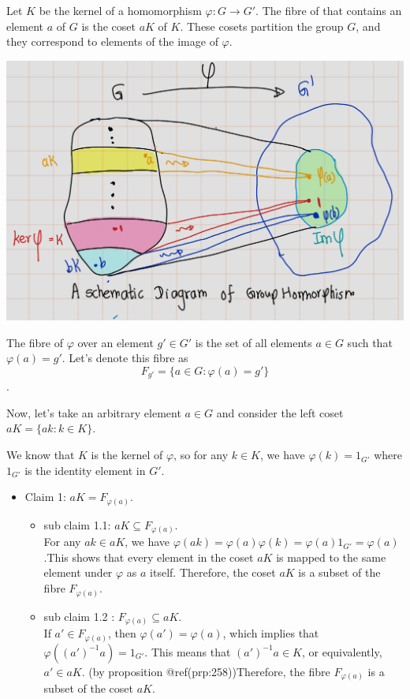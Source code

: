 \documentclass[
]{book}
\providecommand{\tightlist}{%
  \setlength{\itemsep}{0pt}\setlength{\parskip}{0pt}}
\begin{document}
\leavevmode{}%
Let \(K\) be the kernel of a homomorphism \(\varphi: G \to G'\). The
fibre of that contains an element \(a\) of \(G\) is the coset \(a K\) of
\(K\). These cosets partition the group \(G\), and they correspond to
elements of the image of \(\varphi\).

\includegraphics{figures/ch_2/fig35.png}

The fibre of \(\varphi\) over an element \(g' \in G'\) is the set of all
elements \(a \in G\) such that \(\varphi(a) = g'\). Let's denote this
fibre as \[F_{g'} = \{a \in G : \varphi(a) = g'\}\].

Now, let's take an arbitrary element \(a \in G\) and consider the left
coset \(aK = \{ak : k \in K\}\).

We know that \(K\) is the kernel of \(\varphi\), so for any \(k \in K\),
we have \(\varphi(k) = 1_{G'}\) where \(1_{G'}\) is the identity element
in \(G'\).

\begin{itemize}
\tightlist
\item
  Claim 1: \(aK=F_{\varphi(a)}\).

  \begin{itemize}
  \item
    sub claim 1.1: \(aK \subseteq F_{\varphi(a)}\).\\
    For any \(ak \in aK\), we have
    \(\varphi(ak) = \varphi(a)\varphi(k) = \varphi(a)1_{G'} = \varphi(a)\).This
    shows that every element in the coset \(aK\) is mapped to the same
    element under \(\varphi\) as \(a\) itself. Therefore, the coset
    \(aK\) is a subset of the fibre \(F_{\varphi(a)}\).
  \item
    sub claim 1.2 : \(F_{\varphi(a)}\subseteq aK\).\\
    If \(a' \in F_{\varphi(a)}\), then \(\varphi(a') = \varphi(a)\),
    which implies that \(\varphi((a')^{-1}a) = 1_{G'}\). This means that
    \((a')^{-1}a \in K\), or equivalently, \(a' \in aK\). (by
    proposition @ref(prp:258))Therefore, the fibre \(F_{\varphi(a)}\) is
    a subset of the coset \(aK\).
  \end{itemize}
\end{itemize}
\end{document}

